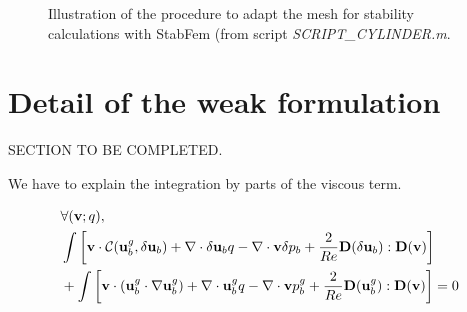 \documentclass[twocolumn,10pt]{asme2ej}
\begin{document}
\begin{figure}
\small
\begin{lstlisting}
\end{lstlisting}
\normalsize

\caption{Illustration of the procedure to adapt the mesh for stability calculations with StabFem (from script {\em SCRIPT\_CYLINDER.m}. }
\label{listing3}
\end{figure}


\section{Detail of the weak formulation}

SECTION TO BE COMPLETED.

We have to explain the integration by parts of the viscous term.




\begin{eqnarray}
\label{NewtonWeak}
&\forall ({\bf v};q), \\
\displaystyle &\int \left[ {\bf v} \cdot {\cal C}( {\bf u}_b^g , \delta {\bf u}_b) +  \nabla  \cdot \delta {\bf u}_b q -\nabla  \cdot {\bf v} \delta p_b
+ \frac{2}{Re} {\bf D}(\delta {\bf u}_b) : {\bf D}({\bf v}) \right]
\nonumber
\\
\nonumber
\displaystyle & + \int \left[ {\bf v} \cdot ( {\bf u}_b^g \cdot \nabla {\bf u}_b^g) 
+ \nabla \cdot {\bf u}_b^g  q 
- \nabla \cdot {\bf v} p_b^g
+ \frac{2}{Re} {\bf D}({\bf u}_b^g) : {\bf D}({\bf v}) \right] = 0 
\end{eqnarray}
\end{document}
